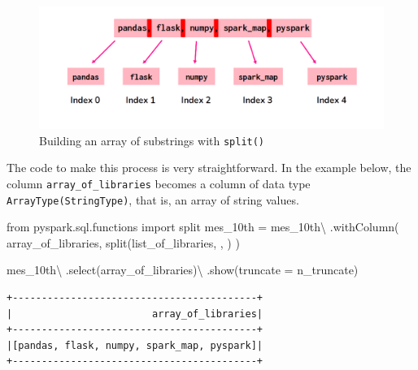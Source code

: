 \documentclass[
  11pt,
  letterpaper,
  DIV=11,
  numbers=noendperiod]{scrreprt}
\newenvironment{Shaded}{\begin{snugshade}}{\end{snugshade}}
\newcommand{\ImportTok}[1]{\textcolor[rgb]{0.00,0.46,0.62}{#1}}
\newcommand{\NormalTok}[1]{\textcolor[rgb]{0.00,0.23,0.31}{#1}}
\newcommand{\OperatorTok}[1]{\textcolor[rgb]{0.37,0.37,0.37}{#1}}
\newcommand{\StringTok}[1]{\textcolor[rgb]{0.13,0.47,0.30}{#1}}
\begin{document}
\begin{figure}

{\centering \includegraphics{Chapters/./../Figures/string-split.png}

}

\caption{\label{fig-string-split}Building an array of substrings with
\texttt{split()}}

\end{figure}

The code to make this process is very straightforward. In the example
below, the column \texttt{array\_of\_libraries} becomes a column of data
type \texttt{ArrayType(StringType)}, that is, an array of string values.

\begin{Shaded}
\begin{Highlighting}[]
\ImportTok{from}\NormalTok{ pyspark.sql.functions }\ImportTok{import}\NormalTok{ split}
\NormalTok{mes\_10th }\OperatorTok{=}\NormalTok{ mes\_10th}\OperatorTok{\textbackslash{}}
\NormalTok{    .withColumn(}
        \StringTok{\textquotesingle{}array\_of\_libraries\textquotesingle{}}\NormalTok{,}
\NormalTok{        split(}\StringTok{\textquotesingle{}list\_of\_libraries\textquotesingle{}}\NormalTok{, }\StringTok{\textquotesingle{}, \textquotesingle{}}\NormalTok{)}
\NormalTok{    )}

\NormalTok{mes\_10th}\OperatorTok{\textbackslash{}}
\NormalTok{    .select(}\StringTok{\textquotesingle{}array\_of\_libraries\textquotesingle{}}\NormalTok{)}\OperatorTok{\textbackslash{}}
\NormalTok{    .show(truncate }\OperatorTok{=}\NormalTok{ n\_truncate)}
\end{Highlighting}
\end{Shaded}

\begin{verbatim}
+------------------------------------------+
|                        array_of_libraries|
+------------------------------------------+
|[pandas, flask, numpy, spark_map, pyspark]|
+------------------------------------------+
\end{verbatim}
\end{document}
